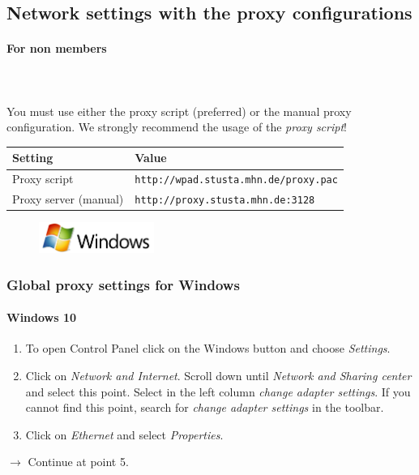 \documentclass[a4paper,12pt]{scrartcl}
\begin{document}
\subsection*{Network settings with the proxy configurations}
\paragraph*{For non members}~\\
\\
You must use either the proxy script (preferred) or the manual proxy configuration. We strongly recommend the usage of the \emph{proxy script}!

\newpage
\begin{center}
  \begin{tabularx}{\linewidth}{|lXp{.2\linewidth}|}
    \hline
    Setting & Value & \\
    \hline \hline
    Proxy script & \multicolumn{2}{l|}{\nolinkurl{http://wpad.stusta.mhn.de/proxy.pac}} \\
    \hline
    Proxy server (manual) & \multicolumn{2}{l|}{\nolinkurl{http://proxy.stusta.mhn.de:3128}} \\
    \hline
  \end{tabularx}
\end{center}



\clearpage
\enlargethispage{20pt}

\begin{figure}[h]
    \raggedleft
    \vspace{-20pt}
    \includegraphics[height=1cm,keepaspectratio]{Bilder/Windows_logo}
    \vspace{-30pt}
\end{figure}

\subsubsection*{Global proxy settings for Windows}

\paragraph*{Windows 10}
\begin{enumerate}
    \item To open Control Panel click on the Windows button and choose \emph{Settings}.
    \item Click on \emph{Network and Internet}. Scroll down until \emph{Network and Sharing center} and select this point. Select in the left column \textit{change adapter settings}. If you cannot find this point, search for \emph{change adapter settings} in the toolbar.
    \item Click on \emph{Ethernet} and select \emph{Properties}.
\end{enumerate}
$\rightarrow$ Continue at point 5.
\end{document}
